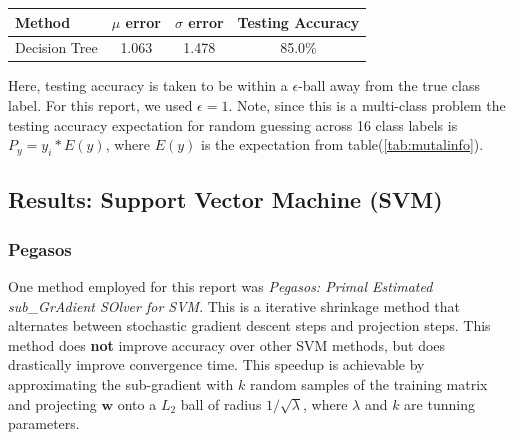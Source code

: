 \documentclass[fleqn]{article}
\begin{document}
\begin{table}[htbp]
	\centering
		\begin{tabular}{ | l | c | c | c |}
  		\hline                        
  		\textbf{Method} & \textbf{$\mu$ error} & \textbf{$\sigma$ error} & \textbf{Testing Accuracy} \\ \hline
  		Decision Tree & 1.063 & 1.478 & 85.0\% \\ \hline
		\end{tabular}
	\label{table:AccuracyDT}
\end{table}
Here, testing accuracy is taken to be within a $\epsilon$-ball away from the true class label.  For this report, we used $\epsilon = 1$.  Note, since this is a multi-class problem the testing accuracy expectation for random guessing across 16 class labels is $P_y = y_i*E(y)$, where $E(y)$ is the expectation from table(\ref{tab:mutalinfo}).

\subsection{Results: Support Vector Machine (SVM)}
\label{sub:resultsSVM}

\subsubsection{Pegasos}
\label{subsub:Pegasos}
One method employed for this report was \textit{Pegasos: Primal Estimated sub\_GrAdient SOlver for SVM}\cite{Shwartz:2007}.  This is a iterative shrinkage method that alternates between stochastic gradient descent steps and projection steps.  This method does \textbf{not} improve accuracy over other SVM methods, but does drastically improve convergence time.  This speedup is achievable by approximating the sub-gradient with $k$ random samples of the training matrix and projecting $\mathbf{w}$ onto a $L_2$ ball of radius $1/\sqrt{\lambda}$, where $\lambda$ and $k$ are tunning parameters.     
\end{document}
